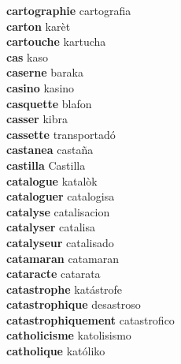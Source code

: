 \textbf{cartographie } cartografia \\
\textbf{carton } karèt \\
\textbf{cartouche } kartucha \\
\textbf{cas } kaso \\
\textbf{caserne } baraka \\
\textbf{casino } kasino \\
\textbf{casquette } blafon \\
\textbf{casser } kibra \\
\textbf{cassette } transportadó \\
\textbf{castanea } castaña \\
\textbf{castilla } Castilla \\
\textbf{catalogue } katalòk \\
\textbf{cataloguer } catalogisa \\
\textbf{catalyse } catalisacion \\
\textbf{catalyser } catalisa \\
\textbf{catalyseur } catalisado \\
\textbf{catamaran } catamaran \\
\textbf{cataracte } catarata \\
\textbf{catastrophe } katástrofe \\
\textbf{catastrophique } desastroso \\
\textbf{catastrophiquement } catastrofico \\
\textbf{catholicisme } katolisismo \\
\textbf{catholique } katóliko \\
